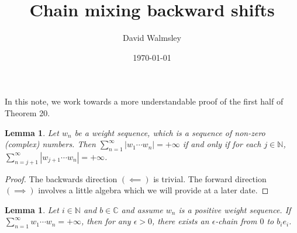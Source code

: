\documentclass{article}
\newcommand{\ds}{\displaystyle}
\newtheorem{lemma}[theorem]{Lemma}
\theoremstyle{definition}\newtheorem{remark}[theorem]{Remark}
\theoremstyle{definition}\newtheorem{example}[theorem]{Example}
\theoremstyle{definition}\newtheorem{fact}[theorem]{Fact}
\theoremstyle{definition}\newtheorem{diagram}[theorem]{Diagram}
\theoremstyle{definition}\newtheorem{definition}[theorem]{Definition}
\theoremstyle{definition}\newtheorem{question}[theorem]{Question}
\newcommand{\N}{\mathbb{N}}
\newcommand{\C}{\mathbb{C}}
\begin{document}
\title{Chain mixing backward shifts}
\author{David Walmsley}
\date{\today}
\maketitle

\large

In this note, we work towards a more understandable proof of the first half of Theorem 20.

\begin{lemma}
    Let $w_n$ be a weight sequence, which is a sequence of non-zero (complex) numbers. Then $\ds\sum_{n=1}^\infty |w_1\cdots w_n| =+\infty$ if and only if for each $j\in \N$, $\ds\sum_{n=j+1}^\infty |w_{j+1}\cdots w_n| =+\infty$.
\end{lemma}

\begin{proof}
    The backwards direction $(\impliedby)$ is trivial. The forward direction $(\implies)$ involves a little algebra which we will provide at a later date.
\end{proof}

\begin{lemma}\label{chain lemma}
    Let $i\in \N$ and $b\in \C$ and assume $w_n$ is a positive weight sequence. If $\ds\sum_{n=1}^\infty w_1\cdots w_n =+\infty$, then for any $\epsilon>0$, there exists an $\epsilon$-chain from $0$ to $b_i e_i$.
\end{lemma}
\end{document}
